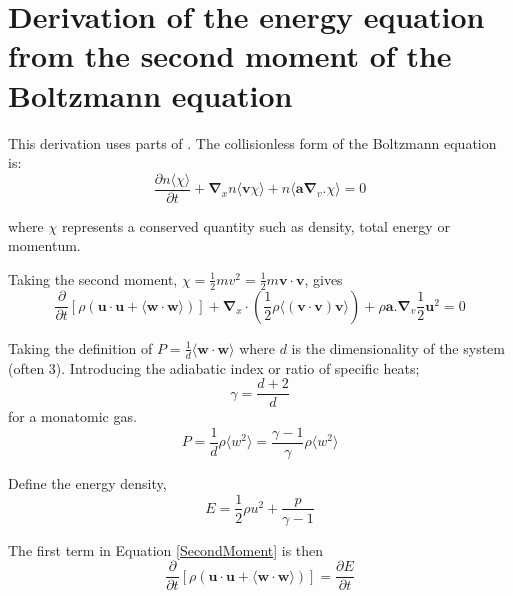 \chapter{Derivation of the energy equation from the second moment of the Boltzmann equation}
\label{MHDDerivation}
This derivation uses parts of \citet{2006Kominsky}.
The collisionless form of the Boltzmann equation is:
\begin{equation}
\frac{\partial{ n \langle \chi \rangle }}{\partial{t}}
+
 {\boldsymbol{\nabla}}_x n{\langle \mathbf{v} \chi \rangle}
+
n
\langle
\mathbf{a}
{\boldsymbol{\nabla}}_v . { \chi }
\rangle
=0
\end{equation}

where $\chi$ represents a conserved quantity such as density, total energy or momentum.




Taking the second moment,  $\chi  = \frac{1}{2} m v^2 =  \frac{1}{2} m  \mathbf{v \cdot v}$, gives
\begin{equation}
\frac{\partial}{\partial t}\left[
\rho
\left(
\mathbf {u \cdot u }
+
\langle
\mathbf {w \cdot w }
\rangle
\right)
\right]
+ {\boldsymbol{\nabla}}_x
\cdot
\left(
\frac{1}{2}
\rho
\langle
\left(
\mathbf{v}
\cdot
\mathbf{v}
\right)
\mathbf{v}
\rangle
\right)
+ \rho \mathbf{a} . {\boldsymbol{\nabla}}_v \frac{1}{2} \mathbf{u}^2
=0
\label{SecondMoment}
\end{equation}


Taking the definition of $ P = \frac{1}{d }\langle \mathbf {w \cdot w } \rangle $ 
where $d$ is the dimensionality of the system (often 3). Introducing the adiabatic index or ratio of specific heats;
\begin{equation}
\gamma = \frac{d+2}{d}
\end{equation}
for a monatomic gas.
\begin{equation}
P = \frac{1}{d} \rho \langle w^2 \rangle = \frac{\gamma -1}{\gamma} \rho \langle w^2 \rangle
\end{equation}


Define the energy density, 
\begin{equation}
E = \frac{1}{2} \rho u^2 + \frac{p}{\gamma -1}
\end{equation}


The first term in Equation \ref{SecondMoment} is then
\begin{equation}
\frac{\partial}{\partial t}\left[
\rho
\left(
\mathbf {u \cdot u }
+
\langle
\mathbf {w \cdot w }
\rangle
\right)
\right]
= 
\frac{\partial E }{\partial t}
\end{equation}

